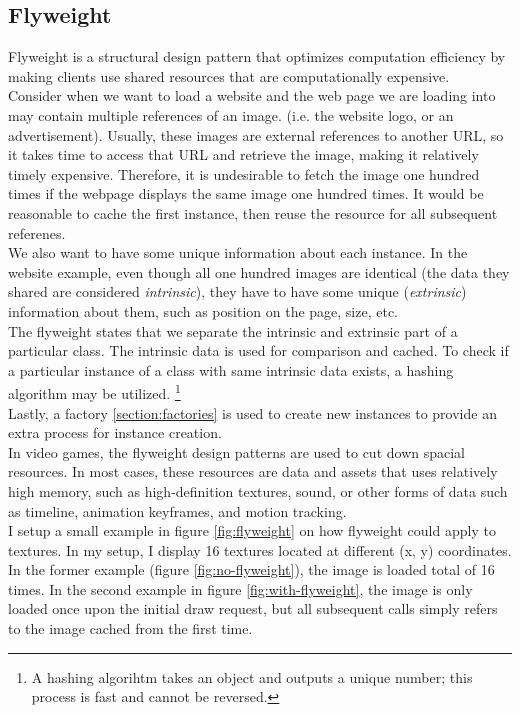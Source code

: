 \begin{multicols}{2}
\subsection{Flyweight}
Flyweight is a structural design pattern that optimizes computation efficiency by making clients use shared resources that are computationally expensive.\bs
\\
Consider when we want to load a website and the web page we are loading into may contain multiple references of an image. (i.e. the website logo, or an advertisement). Usually, these images are external references to another URL, so it takes time to access that URL and retrieve the image, making it relatively timely expensive. Therefore, it is undesirable to fetch the image one hundred times if the webpage displays the same image one hundred times. It would be reasonable to cache the first instance, then reuse the resource for all subsequent referenes.\bs
\\
We also want to have some unique information about each instance. In the website example, even though all one hundred images are identical (the data they shared are considered \textit{intrinsic}), they have to have some unique (\textit{extrinsic}) information about them, such as position on the page, size, etc.\bs
\\
The flyweight states that we separate the intrinsic and extrinsic part of a particular class. The intrinsic data is used for comparison and cached. To check if a particular instance of a class with same intrinsic data exists, a hashing algorithm may be utilized. \footnote{A hashing algorihtm takes an object and outputs a unique number; this process is fast and cannot be reversed.}\bs
\\
Lastly, a factory \ref{section:factories} is used to create new instances to provide an extra process for instance creation.\bs
\\
In video games, the flyweight design patterns are used to cut down spacial resources. In most cases, these resources are data and assets that uses relatively high memory, such as high-definition textures, sound, or other forms of data such as timeline, animation keyframes, and motion tracking.\bs
\\
I setup a small example in figure \ref{fig:flyweight} on how flyweight could apply to textures. In my setup, I display 16 textures located at different (x, y) coordinates. In the former example (figure \ref{fig:no-flyweight}), the image is loaded total of 16 times. In the second example in figure \ref{fig:with-flyweight}, the image is only loaded once upon the initial draw request, but all subsequent calls simply refers to the image cached from the first time.


\end{multicols}
